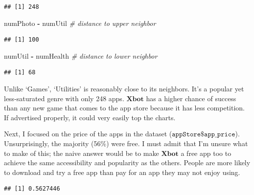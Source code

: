 \documentclass[]{article}
\newenvironment{Shaded}{\begin{snugshade}}{\end{snugshade}}
\newcommand{\CommentTok}[1]{\textcolor[rgb]{0.56,0.35,0.01}{\textit{#1}}}
\newcommand{\DecValTok}[1]{\textcolor[rgb]{0.00,0.00,0.81}{#1}}
\newcommand{\KeywordTok}[1]{\textcolor[rgb]{0.13,0.29,0.53}{\textbf{#1}}}
\newcommand{\NormalTok}[1]{#1}
\newcommand{\OperatorTok}[1]{\textcolor[rgb]{0.81,0.36,0.00}{\textbf{#1}}}
\newcommand{\StringTok}[1]{\textcolor[rgb]{0.31,0.60,0.02}{#1}}
\begin{document}
\begin{verbatim}
## [1] 248
\end{verbatim}

\begin{Shaded}
\begin{Highlighting}[]
\NormalTok{numPhoto }\OperatorTok{-}\StringTok{ }\NormalTok{numUtil  }\CommentTok{# distance to upper neighbor}
\end{Highlighting}
\end{Shaded}

\begin{verbatim}
## [1] 100
\end{verbatim}

\begin{Shaded}
\begin{Highlighting}[]
\NormalTok{numUtil }\OperatorTok{-}\StringTok{ }\NormalTok{numHealth  }\CommentTok{# distance to lower neighbor}
\end{Highlighting}
\end{Shaded}

\begin{verbatim}
## [1] 68
\end{verbatim}

Unlike `Games', `Utilities' is reasonably close to its neighbors. It's a
popular yet less-saturated genre with only 248 apps. \(\textbf{Xbot}\)
has a higher chance of success than any new game that comes to the app
store because it has less competition. If advertised properly, it could
very easily top the charts.

Next, I focused on the price of the apps in the dataset
(\(\texttt{appStore\$app\_price}\)). Unsurprisingly, the majority (56\%)
were free. I must admit that I'm unsure what to make of this; the naive
answer would be to make \(\textbf{Xbot}\) a free app too to achieve the
same accessibility and popularity as the others. People are more likely
to download and try a free app than pay for an app they may not enjoy
using.

\begin{Shaded}
\end{Shaded}

\begin{verbatim}
## [1] 0.5627446
\end{verbatim}
\end{document}
